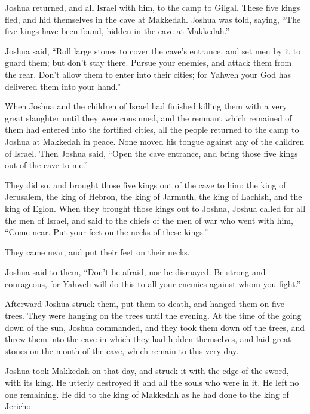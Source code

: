  Joshua returned, and all Israel with him, to the camp to
Gilgal.  These five kings fled, and hid themselves in the
cave at Makkedah.  Joshua was told, saying, ``The five
kings have been found, hidden in the cave at Makkedah.''

 Joshua said, ``Roll large stones to cover the cave's
entrance, and set men by it to guard them;  but don't
stay there. Pursue your enemies, and attack them from the rear. Don't
allow them to enter into their cities; for Yahweh your God has delivered
them into your hand.''

 When Joshua and the children of Israel had finished
killing them with a very great slaughter until they were consumed, and
the remnant which remained of them had entered into the fortified
cities,  all the people returned to the camp to Joshua at
Makkedah in peace. None moved his tongue against any of the children of
Israel.  Then Joshua said, ``Open the cave entrance, and
bring those five kings out of the cave to me.''

 They did so, and brought those five kings out of the
cave to him: the king of Jerusalem, the king of Hebron, the king of
Jarmuth, the king of Lachish, and the king of Eglon. 
When they brought those kings out to Joshua, Joshua called for all the
men of Israel, and said to the chiefs of the men of war who went with
him, ``Come near. Put your feet on the necks of these kings.''

They came near, and put their feet on their necks.

 Joshua said to them, ``Don't be afraid, nor be dismayed.
Be strong and courageous, for Yahweh will do this to all your enemies
against whom you fight.''

 Afterward Joshua struck them, put them to death, and
hanged them on five trees. They were hanging on the trees until the
evening.  At the time of the going down of the sun,
Joshua commanded, and they took them down off the trees, and threw them
into the cave in which they had hidden themselves, and laid great stones
on the mouth of the cave, which remain to this very day.

 Joshua took Makkedah on that day, and struck it with the
edge of the sword, with its king. He utterly destroyed it and all the
souls who were in it. He left no one remaining. He did to the king of
Makkedah as he had done to the king of Jericho.

